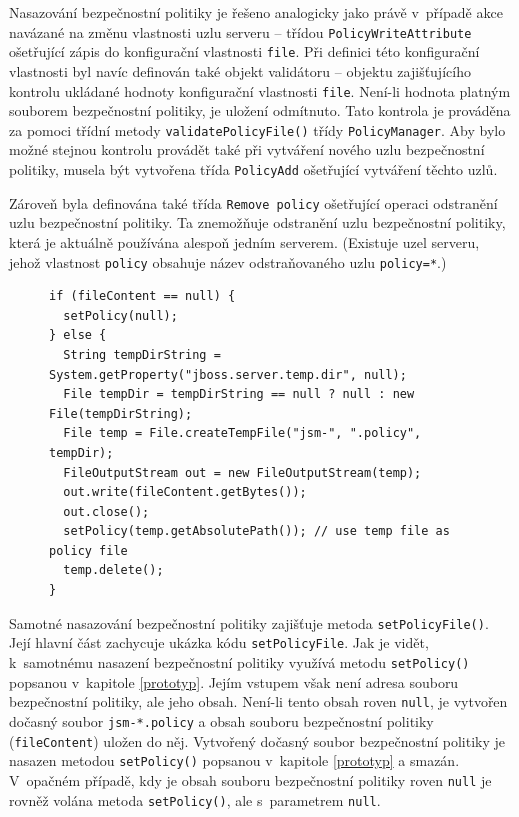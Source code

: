 Nasazování bezpečnostní politiky je řešeno analogicky jako právě v~případě akce navázané na změnu vlastnosti uzlu serveru -- třídou {\tt PolicyWriteAttribute} ošetřující zápis do konfigurační vlastnosti {\tt file}.
Při definici této konfigurační vlastnosti byl navíc definován také objekt validátoru -- objektu zajišťujícího kontrolu ukládané hodnoty konfigurační vlastnosti {\tt file}. Není-li hodnota platným souborem bezpečnostní politiky, je uložení odmítnuto. Tato kontrola je prováděna za pomoci třídní metody {\tt validatePolicyFile()} třídy {\tt PolicyManager}.
Aby bylo možné stejnou kontrolu provádět také při vytváření nového uzlu bezpečnostní politiky, musela být vytvořena třída {\tt PolicyAdd} ošetřující vytváření těchto uzlů.

Zároveň byla definována také třída {\tt Remove policy} ošetřující operaci odstranění uzlu bezpečnostní politiky. Ta znemožňuje odstranění uzlu bezpečnostní politiky, která je aktuálně používána alespoň jedním serverem. (Existuje uzel serveru, jehož vlastnost {\tt policy} obsahuje název odstraňovaného uzlu {\tt policy=*}.)

\begin{figure}[tbh]
\begin{lstlisting}[caption=Klíčová část metody {\tt setPolicyFile()} třídy {\tt PolicyManager}, label=setPolicyFile]
if (fileContent == null) {
  setPolicy(null);
} else {
  String tempDirString = System.getProperty("jboss.server.temp.dir", null);
  File tempDir = tempDirString == null ? null : new File(tempDirString);
  File temp = File.createTempFile("jsm-", ".policy", tempDir);
  FileOutputStream out = new FileOutputStream(temp);
  out.write(fileContent.getBytes());
  out.close();
  setPolicy(temp.getAbsolutePath()); // use temp file as policy file
  temp.delete();
}
\end{lstlisting}
\end{figure}

Samotné nasazování bezpečnostní politiky zajišťuje metoda {\tt setPolicyFile()}. Její hlavní část zachycuje ukázka kódu {\tt setPolicyFile}.
Jak je vidět, k~samotnému nasazení bezpečnostní politiky využívá metodu {\tt setPolicy()} popsanou v~kapitole \ref{prototyp}.
Jejím vstupem však není adresa souboru bezpečnostní politiky, ale jeho obsah. Není-li tento obsah roven {\tt null},
je vytvořen dočasný soubor {\tt jsm-*.policy} a obsah souboru bezpečnostní politiky ({\tt fileContent}) uložen do něj.
Vytvořený dočasný soubor bezpečnostní politiky je nasazen metodou {\tt setPolicy()} popsanou v~kapitole \ref{prototyp} a smazán.
V~opačném případě, kdy je obsah souboru bezpečnostní politiky roven {\tt null} je rovněž volána metoda {\tt setPolicy()}, ale s~parametrem {\tt null}.

